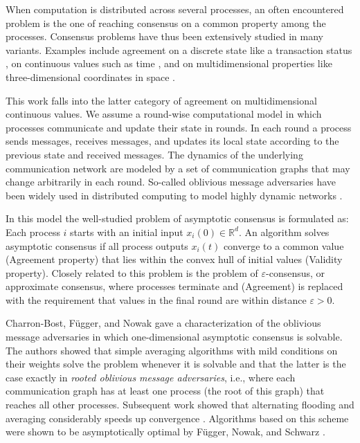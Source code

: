 \documentclass[preprint,12pt,a4paper]{elsarticle}
\theoremstyle{plain}
\theoremstyle{definition}
\newcommand{\IR}{\mathbb{R}}
\begin{document}
When computation is distributed across several processes, an often encountered problem is the one of reaching consensus on a common property among the processes.
Consensus problems have thus been extensively studied in many variants.
Examples include agreement on a discrete state like a transaction status \cite{Lamport82,schneider1990implementing}, on continuous values such as time \cite{Hal84,srikanth87,LL88,dolev2004self,kopetz2009clock}, and on multidimensional properties like three-dimensional coordinates in space \cite{Bal05,murray2007recent,mendes15:multidimensional,FN18:disc}.

This work falls into the latter category of agreement on multidimensional continuous values.
We assume a round-wise computational model in which processes communicate and update their state in rounds.
In each round a process sends messages, receives messages, and updates its local state according to the previous state and received messages.
The dynamics of the underlying communication network are modeled by a set of communication graphs that may change arbitrarily in each round.
So-called oblivious message adversaries have been widely used in distributed computing to model highly dynamic networks \cite{SW89,charron09:HO,afek13:asynchrony,CG15}.

In this model the well-studied problem of asymptotic consensus is formulated as: Each process $i$ starts with an initial input $x_i(0) \in \IR^d$.
An algorithm solves asymptotic consensus if all process outputs $x_i(t)$ converge to a common value (Agreement property) that lies within the convex hull of initial values (Validity property).
Closely related to this problem is the problem of $\varepsilon$-consensus, or approximate consensus, where processes terminate and (Agreement) is replaced with the requirement that values in the final round are within distance $\varepsilon > 0$.

Charron-Bost, Függer, and Nowak \cite{CBFN15:icalp} gave a characterization of the oblivious message adversaries in which one-dimensional asymptotic consensus is solvable.
The authors showed that simple averaging algorithms with mild conditions on their weights solve the problem whenever it is solvable and that the latter is the case exactly in \emph{rooted oblivious message adversaries}, i.e., where each communication graph has at least one process (the root of this graph) that reaches all other processes.
Subsequent work showed that alternating flooding and averaging considerably speeds up convergence \cite{CBFN16:icalp}.
Algorithms based on this scheme were shown to be asymptotically optimal by F{\"u}gger, Nowak, and Schwarz \cite{fugger2021tight}.
\end{document}
